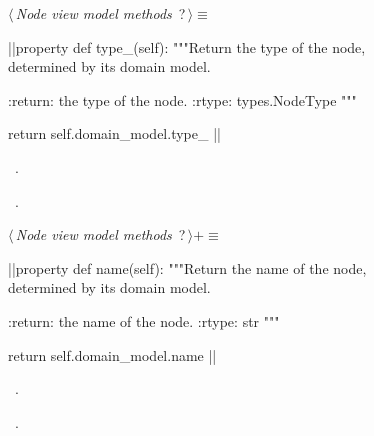\documentclass[%
    a4paper,    %
    justified,  %
    nobib,      %
    openany     %
]{tufte-book}
\begin{document}
\begin{figure}
\begin{flushleft} \small
\begin{minipage}{\linewidth}\label{scrap70}\raggedright\small
{} $\langle\,${\itshape Node view model methods}\nobreak\ {\footnotesize {?}}$\,\rangle\equiv$
\vspace{-1ex}
\begin{pythoncode}
|\normalfont{}\fontfamily{}|property
def type_(self):
    """Return the type of the node, determined by its domain model.

    :return: the type of the node.
    :rtype: types.NodeType
    """

    return self.domain_model.type_
|\NWsep|
\end{pythoncode}
\vspace{1.5ex}
\footnotesize
\begin{list}{}{\setlength{\itemsep}{-\parsep}\setlength{\itemindent}{-\leftmargin}}
\item \NWtxtMacroDefBy\ .
\item \NWtxtMacroRefIn\ .

\item{}
\end{list}
\end{minipage}\vspace{4ex}
\end{flushleft}
\begin{flushleft} \small
\begin{minipage}{\linewidth}\label{scrap71}\raggedright\small
{} $\langle\,${\itshape Node view model methods}\nobreak\ {\footnotesize {?}}$\,\rangle+\equiv$
\vspace{-1ex}
\begin{pythoncode}
|\normalfont{}\fontfamily{}|property
def name(self):
    """Return the name of the node, determined by its domain model.

    :return: the name of the node.
    :rtype: str
    """

    return self.domain_model.name
|\NWsep|
\end{pythoncode}
\vspace{1.5ex}
\footnotesize
\begin{list}{}{\setlength{\itemsep}{-\parsep}\setlength{\itemindent}{-\leftmargin}}
\item \NWtxtMacroDefBy\ .
\item \NWtxtMacroRefIn\ .


\end{list}
\end{minipage}
\end{flushleft}
\end{figure}
\end{document}
